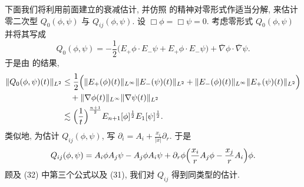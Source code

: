 下面我们将利用前面建立的衰减估计, 并仿照 \cite{klai28} 的精神对零形式作适当分解, 来估计零二次型 $Q_0(\phi,\psi)$ 与 $Q_{ij}(\phi,\psi)$. 设 $\Box\phi=\Box\psi=0$. 考虑零形式 $Q_0(\phi,\psi)$ 并将其写成
\begin{equation}
Q_0(\phi,\psi)=-\frac12\bigl(E_+\phi\cdot E_-\psi+E_+\phi\cdot E_-\psi\bigr)+\bar\nabla\phi\cdot\bar\nabla\psi.\end{equation}
于是由 的结果,
\begin{align*}
\|Q_0(\phi,\psi)(t)\|_{L^2}&\leq\frac12\Bigl(\|E_+(\phi)(t)\|_{L^\infty}\|E_-(\psi)(t)\|_{L^2}+\|E_-(\phi)(t)\|_{L^\infty}\|E_+(\psi)(t)\|_{L^2}\Bigr)\\
&\quad+\|\nabla\phi(t)\|_{L^\infty}\|\nabla\psi(t)\|_{L^2}\\
&\lesssim\Bigl(\frac1t\Bigr)^{\frac{n+1}{2}}E_{n+1}[\phi]^{\frac12}E_1[\psi]^{\frac12}.\end{align*}
类似地, 为估计 $Q_{ij}(\phi,\psi)$, 写 $\partial_i=A_i+\frac{x_i}{|x|}\partial_r$. 于是
\begin{equation}
Q_{ij}(\phi,\psi)=A_i\phi A_j\psi-A_j\phi A_i\psi+\partial_r\phi\Bigl(\frac{x_i}{r}A_j\phi-\frac{x_j}{r}A_i\Bigr)\phi.\end{equation}
顾及 (32) 中第三个公式以及 (31), 我们对 $Q_{ij}$ 得到同类型的估计.
